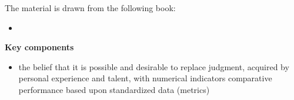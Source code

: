 \begin{frame}
The material is drawn from the following book:

\begin{itemize}
\item {}
\end{itemize}
\end{frame}
\begin{frame}
\nocite{Muller.2018}
\textbf{Key components}\\\vspace{0.3cm}

\begin{itemize}\setlength\itemsep{1em}
\item the belief that it is possible and desirable to replace judgment, acquired by personal experience and talent, with numerical indicators comparative performance based upon standardized data (metrics)
\end{itemize}
\end{frame}

